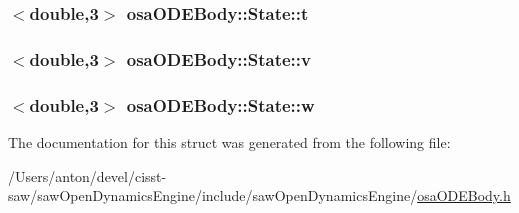 \subsubsection[{t}]{$<$double,3$>$ osa\+O\+D\+E\+Body\+::\+State\+::t}\label{structosa_o_d_e_body_1_1_state_a875d11546272dcb6115ab1a4d7855370}
\hypertarget{structosa_o_d_e_body_1_1_state_a6158fd319c583980e491d74b490083f6}{}
\subsubsection[{v}]{$<$double,3$>$ osa\+O\+D\+E\+Body\+::\+State\+::v}\label{structosa_o_d_e_body_1_1_state_a6158fd319c583980e491d74b490083f6}
\hypertarget{structosa_o_d_e_body_1_1_state_af6b430eb6faf7e341b4647b5cd690c07}{}
\subsubsection[{w}]{$<$double,3$>$ osa\+O\+D\+E\+Body\+::\+State\+::w}\label{structosa_o_d_e_body_1_1_state_af6b430eb6faf7e341b4647b5cd690c07}


The documentation for this struct was generated from the following file\+:\begin{DoxyCompactItemize}
\item 
/\+Users/anton/devel/cisst-\/saw/saw\+Open\+Dynamics\+Engine/include/saw\+Open\+Dynamics\+Engine/\hyperlink{osa_o_d_e_body_8h}{osa\+O\+D\+E\+Body.\+h}\end{DoxyCompactItemize}
